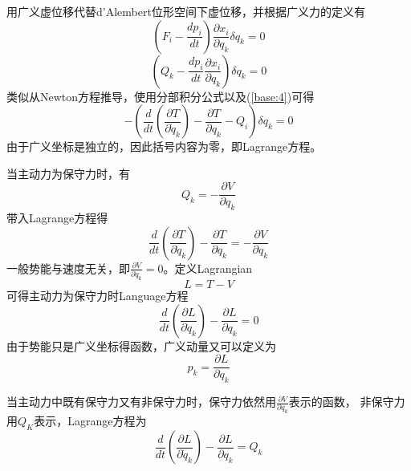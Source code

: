 \documentclass[12pt]{article}
\numberwithin{equation}{section}
\begin{document}
        用广义虚位移代替d'Alembert位形空间下虚位移，并根据广义力的定义有
        \begin{equation*}
            \left(F_i-\frac{dp_i}{dt}\right)\frac{\partial x_i}{\partial q_k}\delta q_k=0
        \end{equation*}
        \begin{equation}\label{deriv:2}
            \left(Q_k-\frac{dp_i}{dt}\frac{\partial x_i}{\partial q_k}\right)\delta q_k=0
        \end{equation}
        类似从Newton方程推导，使用分部积分公式以及(\ref{base:4})可得
        \begin{equation}\label{deriv:3}
            -\left(\frac{d}{dt}\left(\frac{\partial T}{\partial \dot{q}_k}\right)-\frac{\partial T}{\partial q_k}-Q_i\right)\delta q_k=0
        \end{equation}
        由于广义坐标是独立的，因此括号内容为零，即Lagrange方程。

        当主动力为保守力时，有
        \begin{equation}\label{conservation}
            Q_k=-\frac{\partial V}{\partial q_k}
        \end{equation}
        带入Lagrange方程得
        \begin{equation}\label{Lagrange:2}
            \frac{d}{dt}\left(\frac{\partial T}{\partial \dot{q}_k}\right)-\frac{\partial T}{\partial q_k}=-\frac{\partial V}{\partial q_k}
        \end{equation}
        一般势能与速度无关，即$\frac{\partial V}{\partial \dot{q}_k}=0$。定义Lagrangian
        \begin{equation}\label{Lagrangian}
            L=T-V
        \end{equation}
        可得主动力为保守力时Language方程
        \begin{equation}\label{Lagrange-conserv}
            \frac{d}{dt}\left(\frac{\partial L}{\partial \dot{q}_k}\right)-\frac{\partial L}{\partial q_k}=0
        \end{equation}
        由于势能只是广义坐标得函数，广义动量又可以定义为
        \begin{equation}\label{general-moment}
            p_k=\frac{\partial L}{\partial \dot{q}_k}
        \end{equation}

        当主动力中既有保守力又有非保守力时，保守力依然用$\frac{\partial V}{\partial q_k}$表示的函数，
        非保守力用$Q_K$表示，Lagrange方程为
        \begin{equation}\label{Lagrange-nonconserv}
            \frac{d}{dt}\left(\frac{\partial L}{\partial \dot{q}_k}\right)-\frac{\partial L}{\partial q_k}=Q_k
        \end{equation}
\end{document}
